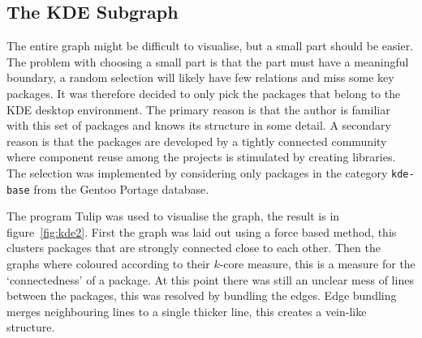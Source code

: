 \documentclass[smallextended,final]{svjour3}
\begin{document}
\subsection{The KDE Subgraph}

The entire graph might be difficult to visualise, but a small part should be easier. The problem with choosing a small part is that the part must have a meaningful boundary, a random selection will likely have few relations and miss some key packages. It was therefore decided to only pick the packages that belong to the KDE desktop environment. The primary reason is that the author is familiar with this set of packages and knows its structure in some detail. A secondary reason is that the packages are developed by a tightly connected community where component reuse among the projects is stimulated by creating libraries. The selection was implemented by considering only packages in the category \verb|kde-base| from the Gentoo Portage database.

The program Tulip was used to visualise the graph, the result is in figure~\ref{fig:kde2}. First the graph was laid out using a force based method, this clusters packages that are strongly connected close to each other. Then the graphs where coloured according to their $k$-core measure, this is a measure for the `connectedness' of a package. At this point there was still an unclear mess of lines between the packages, this was resolved by bundling the edges. Edge bundling merges neighbouring lines to a single thicker line, this creates a vein-like structure. 
\end{document}
